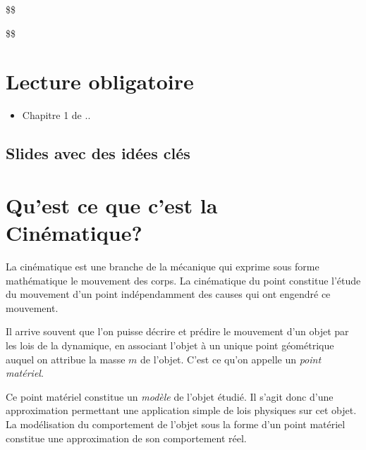 \documentclass[
  12pt,
  openany]{book}
\author{}
\date{}
\providecommand{\tightlist}{%
  \setlength{\itemsep}{0pt}\setlength{\parskip}{0pt}}
\theoremstyle{plain}
\theoremstyle{remark}
\begin{document}
\frontmatter


\mainmatter
\$\$

\newcommand\Ccancel[2][black]{
    \let\OldcancelColor\CancelColor
    \renewcommand\CancelColor{\color{#1}}
    \cancel{#2}
    \renewcommand\CancelColor{\OldcancelColor}
}

\$\$

\chapter{Lecture obligatoire}\label{lecture-obligatoire}

\begin{itemize}
\tightlist
\item
  Chapitre 1 de ..
\end{itemize}

\section{Slides avec des idées
clés}\label{slides-avec-des-iduxe9es-cluxe9s}

\chapter{Qu'est ce que c'est la
Cinématique?}\label{quest-ce-que-cest-la-cinuxe9matique}

La cinématique est une branche de la mécanique qui exprime sous forme
mathématique le mouvement des corps. La cinématique du point constitue
l'étude du mouvement d'un point indépendamment des causes qui ont
engendré ce mouvement.

\begin{tcolorbox}[enhanced jigsaw, arc=.35mm, bottomrule=.15mm, bottomtitle=1mm, breakable, colback=white, colbacktitle=quarto-callout-note-color!10!white, colframe=quarto-callout-note-color-frame, coltitle=black, left=2mm, leftrule=.75mm, opacityback=0, opacitybacktitle=0.6, rightrule=.15mm, title=\textcolor{quarto-callout-note-color}{\faInfo}\hspace{0.5em}{Point matériel}, titlerule=0mm, toprule=.15mm, toptitle=1mm]

Il arrive souvent que l'on puisse décrire et prédire le mouvement d'un
objet par les lois de la dynamique, en associant l'objet à un unique
point géométrique auquel on attribue la masse \(m\) de l'objet. C'est ce
qu'on appelle un \emph{point matériel}.

Ce point matériel constitue un \emph{modèle} de l'objet étudié. Il
s'agit donc d'une approximation permettant une application simple de
lois physiques sur cet objet. La modélisation du comportement de l'objet
sous la forme d'un point matériel constitue une approximation de son
comportement réel.

\end{tcolorbox}
\end{document}
